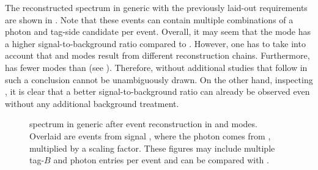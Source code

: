 The reconstructed \BtoXsgamma spectrum in generic \MC with the previously laid-out requirements are shown in .
Note that these events can contain multiple combinations of a photon and tag-side candidate per event.
Overall, it may seem that the \feiBz mode has a higher signal-to-background ratio compared to \feiBp.
However, one has to take into account that \feiBp and \feiBz modes result
from different reconstruction chains.
Furthermore, \feiBz has fewer modes than \feiBp (see ).
Therefore, without additional studies that follow in  such a conclusion cannot be unambiguously drawn. 
On the other hand, inspecting , it is clear that a better signal-to-background ratio can already be observed even without any additional background treatment.

\begin{figure}[hbtp!]
    \centering
    \caption{\label{fig:spectrum_after_reco} \BtoXsgamma spectrum in generic \MC after event reconstruction in \feiBp and \feiBz modes.
    Overlaid are events from signal \MC, where the photon comes from \BtoXsgamma, multiplied by a scaling factor.
    These figures may include multiple tag-$B$ and photon entries per event and can be compared with .
    }
\end{figure}


